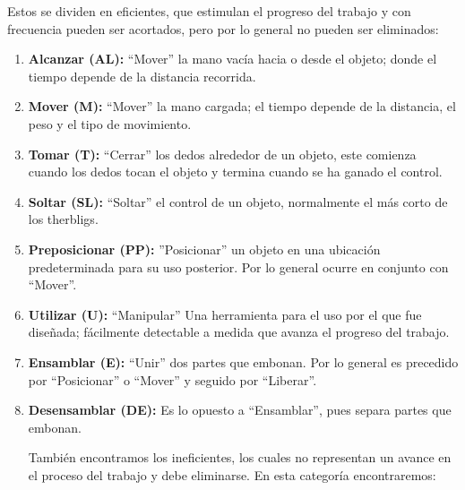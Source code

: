 Estos se dividen en eficientes, que estimulan el progreso del trabajo y con frecuencia pueden ser acortados, pero por lo general no pueden ser eliminados:
\begin{enumerate}
    \item \textbf{Alcanzar (AL):} “Mover” la mano vacía hacia o desde el objeto; donde el tiempo depende de la distancia recorrida.
    \item \textbf{Mover (M):} “Mover” la mano cargada; el tiempo depende de la distancia, el peso y el tipo de movimiento.
    \item \textbf{Tomar (T):} “Cerrar” los dedos alrededor de un objeto, este comienza cuando los dedos tocan el objeto y termina cuando se ha ganado el control.
    \item \textbf{Soltar (SL):} “Soltar” el control de un objeto, normalmente el más corto de los therbligs.
    \item \textbf{Preposicionar (PP):} ”Posicionar” un objeto en una ubicación predeterminada para su uso posterior. Por lo general ocurre en conjunto con “Mover”.
    \item \textbf{Utilizar (U):} “Manipular” Una herramienta para el uso por el que fue diseñada; fácilmente detectable a medida que avanza el progreso del trabajo.
    \item \textbf{Ensamblar (E):} “Unir” dos partes que embonan. Por lo general es precedido por “Posicionar” o “Mover” y seguido por “Liberar”.
	\item \textbf{Desensamblar (DE):} Es lo opuesto a “Ensamblar”, pues separa partes que embonan.

 También encontramos los ineficientes, los cuales no representan un avance en el proceso del trabajo y debe eliminarse. En esta categoría encontraremos:


\end{enumerate}
